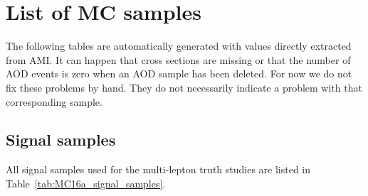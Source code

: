 
\section{List of MC samples}
\label{app:list_of_mc_samples}

The following tables are automatically generated with values directly extracted from AMI. It can happen that cross sections are missing or that the number of AOD events is zero when an AOD sample has been deleted. For now we do not fix these problems by hand. They do not necessarily indicate a problem with that corresponding sample.

\subsection{Signal samples}

All signal samples used for the multi-lepton truth studies are listed in Table~\ref{tab:MC16a_signal_samples}. 

